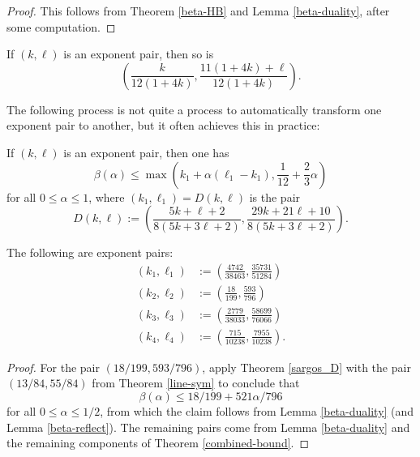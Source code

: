 \literature
{}

\begin{proof} This follows from Theorem \ref{beta-HB} and Lemma \ref{beta-duality}, after some computation.
\end{proof}


\begin{theorem}\label{sargos_C}\cite[Theorem 5]{sargos_analog_2003}  If $(k,\ell)$ is an exponent pair, then so is
    $$ \left(\frac{k}{12(1+4k)}, \frac{11(1+4k)+\ell}{12(1+4k)}\right).$$
\end{theorem}

\literature
{}

The following process is not quite a process to automatically transform one exponent pair to another, but it often achieves this in practice:

\begin{theorem}\label{sargos_D}\cite[Theorem 7.1]{sargos_points_1995}  If $(k,\ell)$ is an exponent pair, then one has
    $$ \beta(\alpha) \leq \max\left( k_1 + \alpha(\ell_1-k_1), \frac{1}{12} + \frac{2}{3} \alpha\right)$$
    for all $0 \leq \alpha \leq 1$, where $(k_1,\ell_1) = D(k,\ell)$ is the pair
$$ D(k,\ell) := \left(\frac{5k+\ell+2}{8(5k+3\ell+2)}, \frac{29k+21\ell+10}{8(5k+3\ell+2)}\right).$$
\end{theorem}

\literature
{}


\begin{theorem}\label{trudgian_yang_eps}\cite[Lemma 1.1]{trudgian-yang}  The following are exponent pairs:
\begin{align*}
 (k_1,\ell_1) &:= \left(\frac{4742}{38463}, \frac{35731}{51284}\right)\\
 (k_2,\ell_2) &:= \left(\frac{18}{199}, \frac{593}{796}\right)\\
 (k_3,\ell_3) &:= \left(\frac{2779}{38033}, \frac{58699}{76066}\right)\\
 (k_4,\ell_4) &:= \left(\frac{715}{10238}, \frac{7955}{10238}\right).
\end{align*}
\end{theorem}

\literature
{}

\begin{proof}  For the pair $(18/199, 593/796)$, apply Theorem \ref{sargos_D} with the pair $(13/84, 55/84)$ from Theorem \ref{line-sym} to conclude that
    $$ \beta(\alpha) \leq 18/199 + 521 \alpha / 796$$
    for all $0 \leq \alpha \leq 1/2$, from which the claim follows from Lemma \ref{beta-duality} (and Lemma \ref{beta-reflect}).
The remaining pairs come from Lemma \ref{beta-duality} and the remaining components of Theorem \ref{combined-bound}.
\end{proof}

